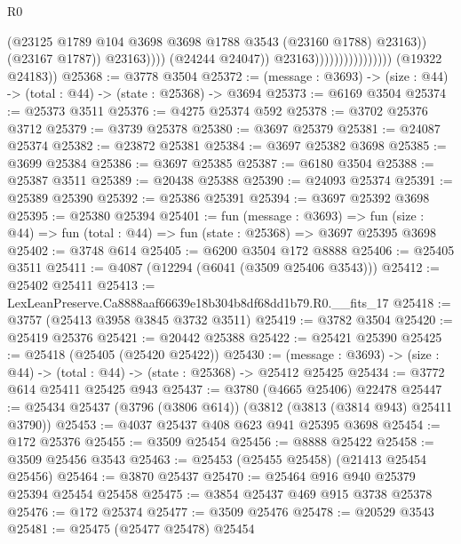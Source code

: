 \begin{lexlean}{R0}
\begin{coremodule}
                                                    (@23125
                                                      @1789
                                                      @104
                                                      @3698
                                                      @3698
                                                      @1788
                                                      @3543
                                                      (@23160 @1788)
                                                      @23163))
                                                  (@23167 @1787))
                                                @23163))))
                                        (@24244 @24047))
                                      @23163))))))))))))))))
      (@19322 @24183))
@25368 := @3778 @3504
@25372 := (message : @3693) -> (size : @44) -> (total : @44) -> (state : @25368) -> @3694
@25373 := @6169 @3504
@25374 := @25373 @3511
@25376 := @4275 @25374 @592
@25378 := @3702 @25376 @3712
@25379 := @3739 @25378
@25380 := @3697 @25379
@25381 := @24087 @25374
@25382 := @23872 @25381
@25384 := @3697 @25382 @3698
@25385 := @3699 @25384
@25386 := @3697 @25385
@25387 := @6180 @3504
@25388 := @25387 @3511
@25389 := @20438 @25388
@25390 := @24093 @25374
@25391 := @25389 @25390
@25392 := @25386 @25391
@25394 := @3697 @25392 @3698
@25395 := @25380 @25394
@25401 := fun (message : @3693) =>
  fun (size : @44) => fun (total : @44) => fun (state : @25368) => @3697 @25395 @3698
@25402 := @3748 @614
@25405 := @6200 @3504 @172 @8888
@25406 := @25405 @3511
@25411 := @4087 (@12294 (@6041 (@3509 @25406 @3543)))
@25412 := @25402 @25411
@25413 := LexLeanPreserve.Ca8888aaf66639e18b304b8df68dd1b79.R0.__fits_17
@25418 := @3757 (@25413 @3958 @3845 @3732 @3511)
@25419 := @3782 @3504
@25420 := @25419 @25376
@25421 := @20442 @25388
@25422 := @25421 @25390
@25425 := @25418 (@25405 (@25420 @25422))
@25430 := (message : @3693) -> (size : @44) -> (total : @44) -> (state : @25368) -> @25412 @25425
@25434 := @3772 @614 @25411 @25425 @943
@25437 := @3780 (@4665 @25406) @22478
@25447 := @25434 @25437 (@3796 (@3806 @614)) (@3812 (@3813 (@3814 @943) @25411 @3790))
@25453 := @4037 @25437 @408 @623 @941 @25395 @3698
@25454 := @172 @25376
@25455 := @3509 @25454
@25456 := @8888 @25422
@25458 := @3509 @25456 @3543
@25463 := @25453 (@25455 @25458) (@21413 @25454 @25456)
@25464 := @3870 @25437
@25470 := @25464 @916 @940 @25379 @25394 @25454 @25458
@25475 := @3854 @25437 @469 @915 @3738 @25378
@25476 := @172 @25374
@25477 := @3509 @25476
@25478 := @20529 @3543
@25481 := @25475 (@25477 @25478) @25454

\end{coremodule}
\end{lexlean}
